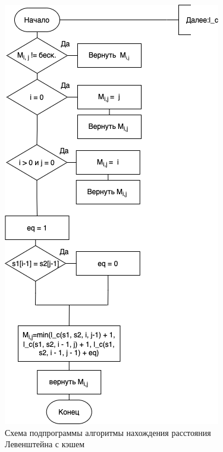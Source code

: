 \documentclass[14pt,russian]{scrartcl}
\begin{document}
\begin{figure}[h]
	\centering
	\includegraphics[scale=0.85]{lev_cache_aux.png}
	\caption{Схема подпрограммы алгоритмы нахождения расстояния Левенштейна с кэшем}
	\label{fig:rec_lev_cache_aux}
\end{figure}
\end{document}
